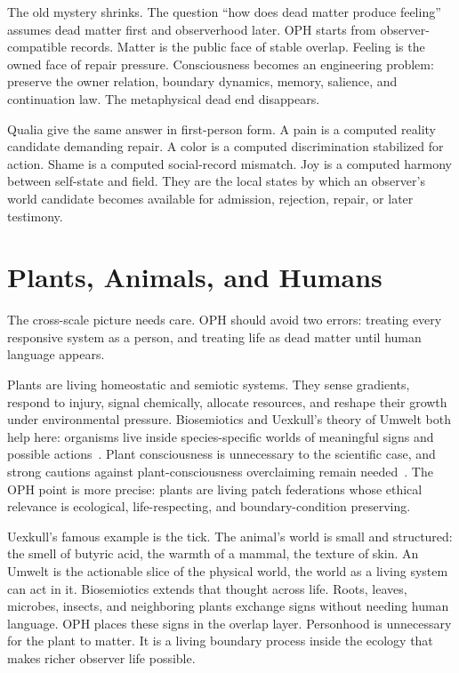 \documentclass[11pt]{article}
\theoremstyle{remark}
\theoremstyle{plain}
\begin{document}
The old mystery shrinks. The question ``how does dead matter produce feeling''
assumes dead matter first and observerhood later. OPH starts from
observer-compatible records. Matter is the public face of stable overlap.
Feeling is the owned face of repair pressure. Consciousness becomes an
engineering problem: preserve the owner relation, boundary dynamics, memory,
salience, and continuation law. The metaphysical dead end disappears.

Qualia give the same answer in first-person form. A pain is a computed reality
candidate demanding repair. A color is a computed discrimination stabilized for
action. Shame is a computed social-record mismatch. Joy is a computed harmony
between self-state and field. They are the local states by which an observer's
world candidate becomes available
for admission, rejection, repair, or later testimony.

\section{Plants, Animals, and Humans}

The cross-scale picture needs care. OPH should avoid two errors: treating
every responsive system as a person, and treating life as dead matter until
human language appears.

Plants are living homeostatic and semiotic systems. They sense gradients,
respond to injury, signal chemically, allocate resources, and reshape their
growth under environmental pressure. Biosemiotics and Uexkull's theory of
Umwelt both help here: organisms live inside species-specific worlds of
meaningful signs and possible actions~\cite{Uexkull1934,Hoffmeyer2008,Hornborg2024}.
Plant consciousness is unnecessary to the scientific case, and strong cautions
against plant-consciousness overclaiming remain needed~\cite{Taiz2019}. The
OPH point is more precise: plants are living patch
federations whose ethical relevance is ecological, life-respecting, and
boundary-condition preserving.

Uexkull's famous example is the tick. The animal's world is small and
structured: the smell of butyric acid, the warmth of a mammal, the texture of
skin. An Umwelt is the actionable slice of the physical world, the world as a
living system can act in it. Biosemiotics extends that thought across life.
Roots, leaves,
microbes, insects, and neighboring plants exchange signs without needing human
language. OPH places these signs in the overlap layer. Personhood is unnecessary
for the plant to matter. It is a living boundary process inside the ecology that
makes richer observer life possible.
\end{document}
